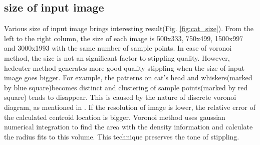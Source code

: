 \documentclass[11pt]{article}
\begin{document}
\subsection{size of input image}
Various size of input image brings interesting result(Fig. \ref{fig:cat_size}). From the left to the right column, the size of each image is 500x333, 750x499, 1500x997 and 3000x1993 with the same number of sample points. In case of voronoi method, the size is not an significant factor to stippling quality. However, hedcuter method generates more good quality stippling when the size of input image goes bigger. For example, the patterns on cat's head and whiskers(marked by blue square)becomes distinct and clustering of sample points(marked by red square) tends to disappear. This is caused by the nature of discrete voronoi diagram, as mentioned in \cite{secord02}. If the resolution of image is lower, the relative error of the calculated centroid location is bigger. Voronoi method uses gaussian numerical integration to find the area with the density information and calculate the radius fits to this volume. This technique preserves the tone of stippling. 
\end{document}
